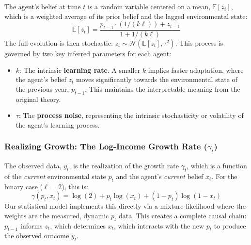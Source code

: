 \documentclass{article}
\begin{document}
The agent's belief at time \(t\) is a random variable centered on a mean, \(\mathbb{E}[z_t]\), which is a weighted average of its prior belief and the lagged environmental state:
\begin{equation}
    \mathbb{E}[z_t] = \frac{p_{t-1} \cdot (1 / (k \ell)) + z_{t-1}}{1 + 1 / (k \ell)}
\end{equation}
The full evolution is then stochastic: \(z_t \sim \mathcal{N}(\mathbb{E}[z_t], \tau^2)\). This process is governed by two key inferred parameters for each agent:
\begin{itemize}
    \item \(k\): The intrinsic \textbf{learning rate}. A smaller \(k\) implies faster adaptation, where the agent's belief \(z_t\) moves significantly towards the environmental state of the previous year, \(p_{t-1}\). This maintains the interpretable meaning from the original theory.
    \item \(\tau\): The \textbf{process noise}, representing the intrinsic stochasticity or volatility of the agent's learning process.
\end{itemize}

\subsubsection{Realizing Growth: The Log-Income Growth Rate (\(\gamma_t\))}
The observed data, \(y_t\), is the realization of the growth rate \(\gamma_t\), which is a function of the \textit{current} environmental state \(p_t\) and the agent's \textit{current} belief \(x_t\). For the binary case (\(\ell=2\)), this is:
\begin{equation}
    \gamma(p_t, x_t) = \log(2) + p_t \log(x_t) + (1-p_t) \log(1-x_t)
\end{equation}
Our statistical model implements this directly via a mixture likelihood where the weights are the measured, dynamic \(p_t\) data. This creates a complete causal chain: \(p_{t-1}\) informs \(z_t\), which determines \(x_t\), which interacts with the new \(p_t\) to produce the observed outcome \(y_t\).
\end{document}
